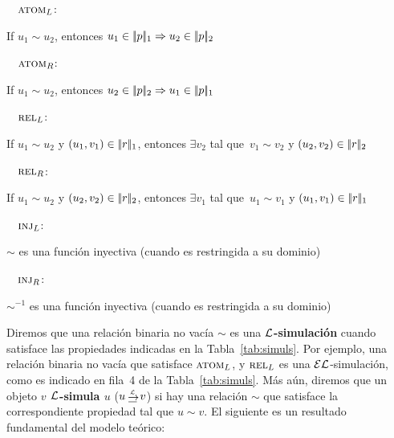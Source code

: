 \newcommand{\simdef}[2]{\noindent\ \ #1\hfill:\ \parbox[t]{.87\textwidth}{#2}\par}

\simdef{$\textsc{atom}_L$}{If $u_1{\sim} u_2$, entonces $u_1 \in |\!|p|\!|_1 \Rightarrow u_2 \in |\!|p|\!|_2$}
\simdef{$\textsc{atom}_R$}{If $u_1{\sim} u_2$, entonces $u_2 \in |\!|p|\!|_2 \Rightarrow u_1 \in |\!|p|\!|_1$}
\simdef{$\textsc{rel}_L$}{If $u_1{\sim} u_2$ y $(u_1,v_1) \in |\!|r|\!|_1$, entonces $\exists v_2$ tal que\ $v_1{\sim}v_2$
  y $(u_2,v_2) \in |\!|r|\!|_2$}
\simdef{$\textsc{rel}_R$}{If $u_1{\sim}u_2$ y $(u_2,v_2) \in |\!|r|\!|_2$, entonces $\exists v_1$ tal que\ $u_1{\sim}v_1$ y
 $(u_1,v_1) \in |\!|r|\!|_1$}
\simdef{$\textsc{inj}_L\space$}{$\sim$ es una funci\'on inyectiva (cuando es restringida a su dominio)}
\simdef{$\textsc{inj}_R\space$}{$\sim^{-1}$ es una funci\'on inyectiva (cuando es restringida a su dominio)}
\smallskip

Diremos que una relaci\'on binaria no vac\'ia $\sim$ es una 
{\bf $\mathcal{L}$-simulaci\'on} cuando satisface las propiedades indicadas
en la Tabla~\ref{tab:simuls}. Por ejemplo, una relaci\'on binaria no vac\'ia que satisface $\textsc{atom}_L$, y $\textsc{rel}_L$ es una $\mathcal{EL}$-simulaci\'on, 
como es indicado en fila~4 de la Tabla~\ref{tab:simuls}. M\'as a\'un, diremos que un objeto
{\bf $v$ $\mathcal{L}$-simula $u$} ($u \simul{\+L} v$) si hay una relaci\'on $\sim$ que satisface la correspondiente propiedad tal que
$u \sim v$. El siguiente es un resultado fundamental del modelo te\'orico:%

